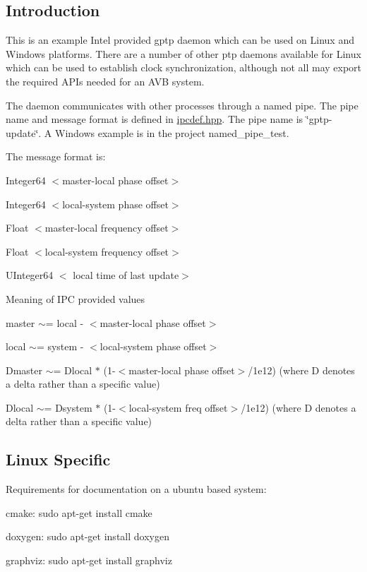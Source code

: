 \subsection*{Introduction }

This is an example Intel provided gptp daemon which can be used on Linux and Windows platforms. There are a number of other ptp daemons available for Linux which can be used to establish clock synchronization, although not all may export the required A\+P\+Is needed for an A\+VB system.

The daemon communicates with other processes through a named pipe. The pipe name and message format is defined in \hyperlink{ipcdef_8hpp}{ipcdef.\+hpp}. The pipe name is \char`\"{}gptp-\/update\char`\"{}. A Windows example is in the project named\+\_\+pipe\+\_\+test.

The message format is\+:

Integer64 $<$master-\/local phase offset$>$

Integer64 $<$local-\/system phase offset$>$

Float $<$master-\/local frequency offset$>$

Float $<$local-\/system frequency offset$>$

U\+Integer64 $<$ local time of last update$>$

Meaning of I\+PC provided values
\begin{DoxyItemize}
\item master $\sim$= local -\/ $<$master-\/local phase offset$>$
\item local $\sim$= system -\/ $<$local-\/system phase offset$>$
\item Dmaster $\sim$= Dlocal $\ast$ (1-\/$<$master-\/local phase offset$>$/1e12) (where D denotes a delta rather than a specific value)
\item Dlocal $\sim$= Dsystem $\ast$ (1-\/$<$local-\/system freq offset$>$/1e12) (where D denotes a delta rather than a specific value)
\end{DoxyItemize}

\subsection*{Linux Specific }

Requirements for documentation on a ubuntu based system\+:
\begin{DoxyItemize}
\item cmake\+: sudo apt-\/get install cmake
\item doxygen\+: sudo apt-\/get install doxygen
\item graphviz\+: sudo apt-\/get install graphviz
\end{DoxyItemize}

